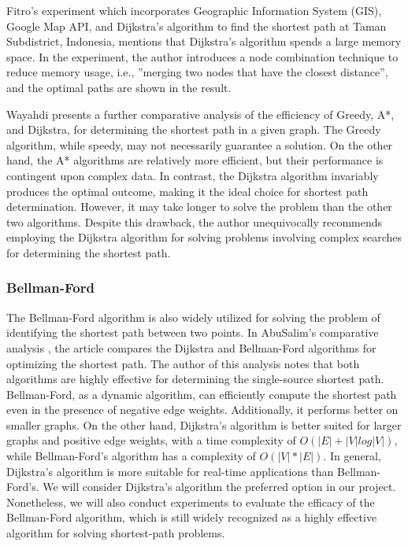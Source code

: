 \documentclass[12pt]{article}
\begin{document}
Fitro’s experiment \cite{Fitro_2018} which incorporates Geographic Information System (GIS), Google Map API, and Dijkstra’s algorithm to find the shortest path at Taman Subdistrict, Indonesia, mentions that Dijkstra’s algorithm spends a large memory space. In the experiment, the author introduces a node combination technique to reduce memory usage, i.e., ”merging two nodes that have the closest distance”, and the optimal paths are shown in the result.

Wayahdi \cite{Wayahdi_2021_GreedyAA} presents a further comparative analysis of the efficiency of Greedy, A*, and Dijkstra, for determining the shortest path in a given graph. The Greedy algorithm, while speedy, may not necessarily guarantee a solution. On the other hand, the A* algorithms are relatively more efficient, but their performance is contingent upon complex data. In contrast, the Dijkstra algorithm invariably produces the optimal outcome, making it the ideal choice for shortest path determination. However, it may take longer to solve the problem than the other two algorithms. Despite this drawback, the author unequivocally recommends employing the Dijkstra algorithm for solving problems involving complex searches for determining the shortest path.

\subsubsection{Bellman-Ford}

The Bellman-Ford algorithm is also widely utilized for solving the problem of identifying the shortest path between two points. In AbuSalim's comparative analysis \cite{AbuSalim_Ibrahim_Zainuri_Saringat_Jamel_Abdul_Wahab_2020}, the article compares the Dijkstra and Bellman-Ford algorithms for optimizing the shortest path. The author of this analysis notes that both algorithms are highly effective for determining the single-source shortest path. Bellman-Ford, as a dynamic algorithm, can efficiently compute the shortest path even in the presence of negative edge weights.
Additionally, it performs better on smaller graphs. On the other hand, Dijkstra's algorithm is better suited for larger graphs and positive edge weights, with a time complexity of \(O(|E|+|V|log|V|)\), while Bellman-Ford's algorithm has a complexity of \(O(|V|*|E|)\). In general, Dijkstra's algorithm is more suitable for real-time applications than Bellman-Ford's. We will consider Dijkstra's algorithm the preferred option in our project. Nonetheless, we will also conduct experiments to evaluate the efficacy of the Bellman-Ford algorithm, which is still widely recognized as a highly effective algorithm for solving shortest-path problems.
\end{document}
